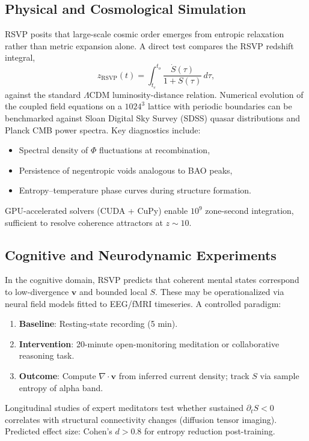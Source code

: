 \documentclass[12pt,a4paper]{article}
\begin{document}
\subsection{Physical and Cosmological Simulation}
RSVP posits that large-scale cosmic order emerges from entropic relaxation rather than metric expansion alone. A direct test compares the RSVP redshift integral,
\begin{equation}
z_{\text{RSVP}}(t) = \int_{t_e}^{t_o} \frac{\dot{S}(\tau)}{1 + S(\tau)} \, d\tau,
\label{eq:rsvp-redshift}
\end{equation}
against the standard $\Lambda$CDM luminosity-distance relation. Numerical evolution of the coupled field equations on a $1024^3$ lattice with periodic boundaries can be benchmarked against Sloan Digital Sky Survey (SDSS) quasar distributions and Planck CMB power spectra. Key diagnostics include:
\begin{itemize}
\item Spectral density of $\Phi$ fluctuations at recombination,
\item Persistence of negentropic voids analogous to BAO peaks,
\item Entropy–temperature phase curves during structure formation.
\end{itemize}
GPU-accelerated solvers (CUDA + CuPy) enable $10^9$ zone-second integration, sufficient to resolve coherence attractors at $z \sim 10$.

\subsection{Cognitive and Neurodynamic Experiments}
In the cognitive domain, RSVP predicts that coherent mental states correspond to low-divergence $\bm{v}$ and bounded local $S$. These may be operationalized via neural field models \cite{deco2008dynamic} fitted to EEG/fMRI timeseries. A controlled paradigm:
\begin{enumerate}
\item \textbf{Baseline}: Resting-state recording (5 min).
\item \textbf{Intervention}: 20-minute open-monitoring meditation or collaborative reasoning task.
\item \textbf{Outcome}: Compute $\nabla\!\cdot\!\bm{v}$ from inferred current density; track $S$ via sample entropy of alpha band.
\end{enumerate}
Longitudinal studies of expert meditators test whether sustained $\partial_t S < 0$ correlates with structural connectivity changes (diffusion tensor imaging). Predicted effect size: Cohen’s $d > 0.8$ for entropy reduction post-training.
\end{document}
